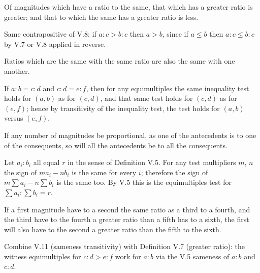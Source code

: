 \documentclass{rrxiv}
\begin{document}
\begin{claim}
\label{prop:V.10}
Of magnitudes which have a ratio to the same, that which has a greater
ratio is greater; and that to which the same has a greater ratio is
less.
\end{claim}
\begin{evidence}[Proof of V.10]
\label{ev:V.10}
Same contrapositive of V.8: if $a:c > b:c$ then $a > b$, since if
$a \le b$ then $a:c \le b:c$ by V.7 or V.8 applied in reverse.
\end{evidence}

\begin{claim}
\label{prop:V.11}
Ratios which are the same with the same ratio are also the same with
one another.
\end{claim}
\begin{evidence}[Proof of V.11]
\label{ev:V.11}
If $a:b = c:d$ and $c:d = e:f$, then for any equimultiples the same
inequality test holds for $(a,b)$ as for $(c,d)$, and that same test
holds for $(c,d)$ as for $(e,f)$; hence by transitivity of the
inequality test, the test holds for $(a,b)$ versus $(e,f)$.
\end{evidence}

\begin{claim}
\label{prop:V.12}
If any number of magnitudes be proportional, as one of the antecedents
is to one of the consequents, so will all the antecedents be to all
the consequents.
\end{claim}
\begin{evidence}[Proof of V.12]
\label{ev:V.12}
Let $a_i : b_i$ all equal $r$ in the sense of Definition V.5.  For
any test multipliers $m$, $n$ the sign of $m a_i - n b_i$ is the same
for every $i$; therefore the sign of $m \sum a_i - n \sum b_i$ is the
same too.  By V.5 this is the equimultiples test for $\sum a_i : \sum
b_i = r$.
\end{evidence}

\begin{claim}
\label{prop:V.13}
If a first magnitude have to a second the same ratio as a third to a
fourth, and the third have to the fourth a greater ratio than a fifth
has to a sixth, the first will also have to the second a greater ratio
than the fifth to the sixth.
\end{claim}
\begin{evidence}[Proof of V.13]
\label{ev:V.13}
Combine V.11 (sameness transitivity) with Definition V.7 (greater
ratio): the witness equimultiples for $c:d > e:f$ work for $a:b$ via
the V.5 sameness of $a:b$ and $c:d$.
\end{evidence}
\end{document}
